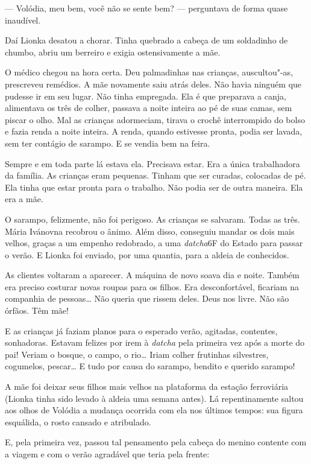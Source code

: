 --- Volódia, meu bem, você não se sente bem? --- perguntava de forma
quase inaudível.

Daí Lionka desatou a chorar. Tinha quebrado a cabeça de um soldadinho de
chumbo, abriu um berreiro e exigia ostensivamente a mãe.

O médico chegou na hora certa. Deu palmadinhas nas crianças,
auscultou"-as, prescreveu remédios. A mãe novamente saiu atrás deles. Não
havia ninguém que pudesse ir em seu lugar. Não tinha empregada. Ela é
que preparava a canja, alimentava os três de colher, passava a noite
inteira ao pé de suas camas, sem piscar o olho. Mal as crianças
adormeciam, tirava o crochê interrompido do bolso e fazia renda a noite
inteira. A renda, quando estivesse pronta, podia ser lavada, sem ter
contágio de sarampo. E se vendia bem na feira.

Sempre e em toda parte lá estava ela. Precisava estar. Era a única
trabalhadora da família. As crianças eram pequenas. Tinham que ser
curadas, colocadas de pé. Ela tinha que estar pronta para o trabalho.
Não podia ser de outra maneira. Ela era a mãe.

\asterisc

O sarampo, felizmente, não foi perigoso. As crianças se salvaram. Todas
as três. Mária Ivánovna recobrou o ânimo. Além disso, conseguiu mandar
os dois mais velhos, graças a um empenho redobrado, a uma
\emph{datcha}6F do Estado para passar o verão. E Lionka foi enviado, por
uma quantia, para a aldeia de conhecidos.

As clientes voltaram a aparecer. A máquina de novo soava dia e noite.
Também era preciso costurar novas roupas para os filhos. Era
desconfortável, ficariam na companhia de pessoas\ldots{} Não queria que
rissem deles. Deus nos livre. Não são órfãos. Têm mãe!

E as crianças já faziam planos para o esperado verão, agitadas,
contentes, sonhadoras. Estavam felizes por irem à \emph{datcha} pela
primeira vez após a morte do pai! Veriam o bosque, o campo, o rio\ldots{}
Iriam colher frutinhas silvestres, cogumelos, pescar\ldots{} E tudo por causa
do sarampo, bendito e querido sarampo!

A mãe foi deixar seus filhos mais velhos na plataforma da estação
ferroviária (Lionka tinha sido levado à aldeia uma semana antes). Lá
repentinamente saltou aos olhos de Volódia a mudança ocorrida com ela
nos últimos tempos: sua figura esquálida, o rosto cansado e atribulado.

E, pela primeira vez, passou tal pensamento pela cabeça do menino
contente com a viagem e com o verão agradável que teria pela frente:

